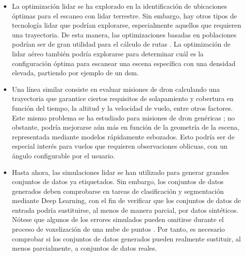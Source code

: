 \begin{itemize}
    \item La optimización \acrshort{lidar} se ha explorado en la identificación de ubicaciones óptimas para el escaneo con \acrshort{lidar} terrestre. Sin embargo, hay otros tipos de tecnología \acrshort{lidar} que podrían explorarse, especialmente aquellos que requieren una trayectoria. De esta manera, las optimizaciones basadas en poblaciones podrían ser de gran utilidad para el cálculo de rutas \cite{roberge_fast_2018}. La optimización de \acrshort{lidar} aéreo también podría explorarse para determinar cuál es la configuración óptima para escanear una escena específica con una densidad elevada, partiendo por ejemplo de un \acrshort{dsm}.
    \item Una línea similar consiste en evaluar misiones de dron calculando una trayectoria que garantice ciertos requisitos de solapamiento y cobertura en función del tiempo, la altitud y la velocidad de vuelo, entre otros factores. Este mismo problema se ha estudiado para misiones de dron genéricas \cite{pessacg_simplifying_2022}; no obstante, podría mejorarse aún más en función de la geometría de la escena, representada mediante modelos rápidamente esbozados. Esto podría ser de especial interés para vuelos que requieren observaciones oblicuas, con un ángulo configurable por el usuario. 
    \item Hasta ahora, las simulaciones \acrshort{lidar} se han utilizado para generar grandes conjuntos de datos ya etiquetados. Sin embargo, los conjuntos de datos generados deben comprobarse en tareas de clasificación y segmentación mediante Deep Learning, con el fin de verificar que los conjuntos de datos de entrada podría sustituirse, al menos de manera parcial, por datos sintéticos. Nótese que algunos de los errores simulados pueden omitirse durante el proceso de voxelización de una nube de puntos \cite{hackel_semantic3d_2017, behley_towards_2021}. Por tanto, es necesario comprobar si los conjuntos de datos generados pueden realmente sustituir, al menos parcialmente, a conjuntos de datos reales. 

\end{itemize}
